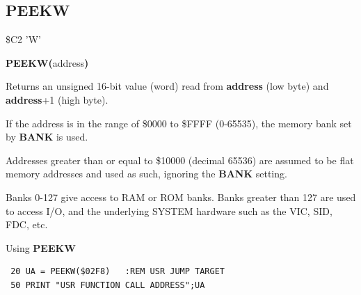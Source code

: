 \subsection{PEEKW}
\begin{description}[leftmargin=2cm,style=nextline]
\item [Token:] \$C2 'W'
\item [Format:] {\bf PEEKW(}address{\bf)}
\item [Usage:]  Returns an unsigned 16-bit value (word)
                read from {\bf address} (low byte) and {\bf address}+1 (high byte).

                If the address is in the range of \$0000 to \$FFFF (0-65535), the
                memory bank set by {\bf BANK} is used.

                Addresses greater than or equal to \$10000 (decimal 65536) are assumed to be flat memory
                addresses and used as such, ignoring the {\bf BANK} setting.


\item [Remarks:] Banks 0-127 give access to RAM or ROM banks.
                 Banks greater than 127 are used to access I/O, and the underlying SYSTEM hardware such as the
                 VIC, SID, FDC, etc.
\item [Example:] Using {\bf PEEKW}

\begin{tcolorbox}[colback=black,coltext=white]
\verbatimfont{\codefont}
\begin{verbatim}
 20 UA = PEEKW($02F8)   :REM USR JUMP TARGET
 50 PRINT "USR FUNCTION CALL ADDRESS";UA
\end{verbatim}
\end{tcolorbox}
\end{description}


\newpage
